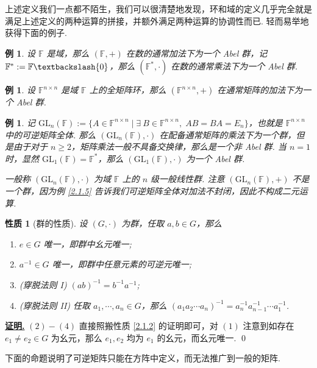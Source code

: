 \documentclass[10pt,openany]{article}
\theoremstyle{thmstyle} %
\theoremstyle{defstyle} %
\theoremstyle{prostyle} %
\newtheorem{property}[theorem]{性质}
\theoremstyle{exastyle}
\newtheorem{example}[theorem]{例}
\theoremstyle{remstyle}
\renewenvironment{proof}[1][证明]{\par\underline{\textbf{#1.}} \;\fangsong}{\qed\par}
\newcommand{\F}{\mathbb{F}}
\newcommand{\gf}{\text{GL}_n(\mathbb{F})}
\newcommand{\n}{^{n \times n}}
\begin{document}
上述定义我们一点都不陌生，我们可以很清楚地发现，环和域的定义几乎完全就是满足上述定义的两种运算的拼接，并额外满足两种运算的协调性而已. 轻而易举地获得下面的例子.

\begin{example}
	设 \( \F \) 是域，那么 \( (\F,+) \) 在数的通常加法下为一个 Abel 群，记 \( \F^*:=\F \textbackslash \{0\} \)，那么 \( (\F^*,\cdot) \) 在数的通常乘法下为一个 Abel 群. 
\end{example}

\begin{example}
	设 \( \F\n \) 是域 \( \F \) 上的全矩阵环，那么 \( (\F\n,+) \) 在通常矩阵的加法下为一个 Abel 群. 
\end{example}

\begin{example}
	记 \( \gf:=\{ A \in \F\n \mid \exists \ B \in \F\n, \; AB=BA=E_n \} \)，也就是 \( \F\n \) 中的可逆矩阵全体. 那么 \( (\gf,\cdot) \) 在配备通常矩阵的乘法下为一个群，但是由于对于 \( n \geq 2 \)，矩阵乘法一般不具备交换律，那么是一个非 Abel 群. 当 \( n=1 \) 时，显然 \( \text{GL}_1(\mathbb{F})= \F^* \)，那么 \( (\text{GL}_1(\mathbb{F}),\cdot) \) 为一个 Abel 群. 
	
	一般称 \( (\gf,\cdot) \) 为域 \( \F \) 上的 \( n \) 级一般线性群. 注意 \( (\gf,+) \) 不是一个群，因为例 \ref{2.1.5} 告诉我们可逆矩阵全体对加法不封闭，因此不构成二元运算.
\end{example}

\begin{property}[群的性质]
	设 \( (G,\cdot) \) 为群，任取 \( a,b \in G \)，那么
	\begin{enumerate}
		\item \( e \in G \) 唯一，即群中幺元唯一;
		\item \( a^{-1} \in G \) 唯一，即群中任意元素的可逆元唯一;
		\item (穿脱法则 I) \( (ab)^{-1}=b^{-1}a^{-1} \);
		\item (穿脱法则 II) 任取 \( a_1,\cdots,a_n \in G \)，那么 \( (a_1a_2\cdots a_n)^{-1}=a_n^{-1}a_{n-1}^{-1}\cdots a_1^{-1} \).
	\end{enumerate}
\end{property}

\begin{proof}
	\( (2)-(4) \) 直接照搬性质 \ref{2.1.2} 的证明即可，对 \( (1) \) 注意到如存在 \( e_1 \neq e_2 \in G \) 为幺元，那么 \( e_1,e_2 \) 均为 \( e_1 \) 的幺元，而幺元唯一.
\end{proof}

下面的命题说明了可逆矩阵只能在方阵中定义，而无法推广到一般的矩阵. 
\end{document}
